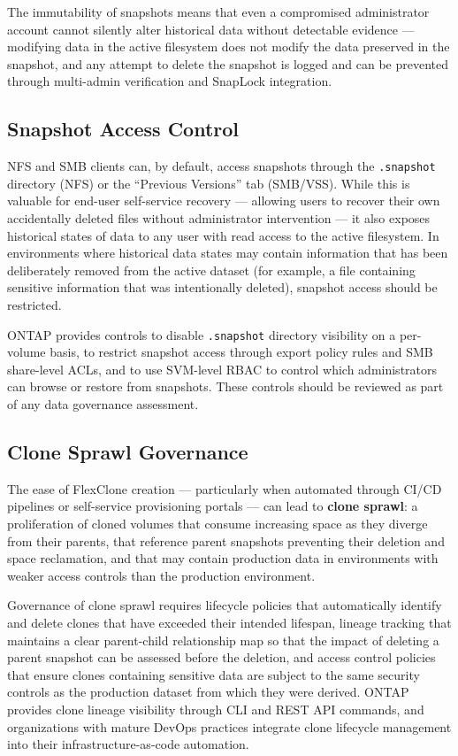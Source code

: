 \begin{securitybox}
The immutability of snapshots means that even a compromised administrator account cannot silently alter historical data without detectable evidence --- modifying data in the active filesystem does not modify the data preserved in the snapshot, and any attempt to delete the snapshot is logged and can be prevented through multi-admin verification and SnapLock integration.

\subsection*{Snapshot Access Control}

NFS and SMB clients can, by default, access snapshots through the \texttt{.snapshot} directory (NFS) or the ``Previous Versions'' tab (SMB/VSS). While this is valuable for end-user self-service recovery --- allowing users to recover their own accidentally deleted files without administrator intervention --- it also exposes historical states of data to any user with read access to the active filesystem. In environments where historical data states may contain information that has been deliberately removed from the active dataset (for example, a file containing sensitive information that was intentionally deleted), snapshot access should be restricted.

ONTAP provides controls to disable \texttt{.snapshot} directory visibility on a per-volume basis, to restrict snapshot access through export policy rules and SMB share-level ACLs, and to use SVM-level RBAC to control which administrators can browse or restore from snapshots. These controls should be reviewed as part of any data governance assessment.

\subsection*{Clone Sprawl Governance}

The ease of FlexClone creation --- particularly when automated through CI/CD pipelines or self-service provisioning portals --- can lead to \textbf{clone sprawl}: a proliferation of cloned volumes that consume increasing space as they diverge from their parents, that reference parent snapshots preventing their deletion and space reclamation, and that may contain production data in environments with weaker access controls than the production environment.

Governance of clone sprawl requires lifecycle policies that automatically identify and delete clones that have exceeded their intended lifespan, lineage tracking that maintains a clear parent-child relationship map so that the impact of deleting a parent snapshot can be assessed before the deletion, and access control policies that ensure clones containing sensitive data are subject to the same security controls as the production dataset from which they were derived. ONTAP provides clone lineage visibility through CLI and REST API commands, and organizations with mature DevOps practices integrate clone lifecycle management into their infrastructure-as-code automation.


\end{securitybox}
